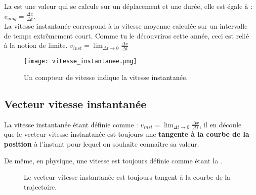 La  est une valeur qui se calcule sur un déplacement et une durée, elle est égale à :
\(v_{moy}=  \frac{\Delta x}{\Delta t}\).\\

La vitesse instantanée correspond à la vitesse moyenne calculée sur un intervalle de temps extrêmement court. Comme tu le découvriras cette année, ceci est relié à la notion de limite.
\(v_{inst}= \lim_{\Delta t \to 0}  \frac{\Delta x}{\Delta t}\)

\begin{figure}[!ht]
    \centering
    \texttt{[image: vitesse\_instantanee.png]}
    \caption{Un compteur de vitesse indique la vitesse instantanée.}
    \label{vitesse_instantanee}
\end{figure}

\newpage

\subsection{Vecteur vitesse instantanée}
La vitesse instantanée étant définie comme : \(v_{inst}= \lim_{\Delta t \to 0}  \frac{\Delta x}{\Delta t}\), il en découle que le vecteur vitesse instantanée est toujours une \textbf{tangente à la courbe de la position} à l'instant pour lequel on souhaite connaître sa valeur.

\begin{encadre}
    De même, en physique, une vitesse est toujours définie comme étant la .
\end{encadre}

\begin{figure}[!ht]
    \centering
    \resizebox{0.8\linewidth}{!}{}
    \caption{Le vecteur vitesse instantanée est toujours tangent à la courbe de la trajectoire.}
    \label{vecteur_vitesse_instantanee}
\end{figure}
\newpage

